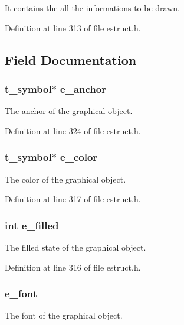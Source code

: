 It contains the all the informations to be drawn. 

Definition at line 313 of file estruct.\-h.



\subsection{Field Documentation}
\hypertarget{struct__egobj_a26003aea4ac1d50f79a5db2e05599222}{
\subsubsection[{e\-\_\-anchor}]{\setlength{\rightskip}{0pt plus 5cm}t\-\_\-symbol$\ast$ e\-\_\-anchor}}\label{struct__egobj_a26003aea4ac1d50f79a5db2e05599222}
The anchor of the graphical object. 

Definition at line 324 of file estruct.\-h.

\hypertarget{struct__egobj_a13dfb00aea95e0dc5b9d1297260a9280}{
\subsubsection[{e\-\_\-color}]{\setlength{\rightskip}{0pt plus 5cm}t\-\_\-symbol$\ast$ e\-\_\-color}}\label{struct__egobj_a13dfb00aea95e0dc5b9d1297260a9280}
The color of the graphical object. 

Definition at line 317 of file estruct.\-h.

\hypertarget{struct__egobj_ae13e50cb319a060b3e612c39d0fc698d}{
\subsubsection[{e\-\_\-filled}]{\setlength{\rightskip}{0pt plus 5cm}int e\-\_\-filled}}\label{struct__egobj_ae13e50cb319a060b3e612c39d0fc698d}
The filled state of the graphical object. 

Definition at line 316 of file estruct.\-h.

\hypertarget{struct__egobj_a4bf02b4e1a6c0c7723b5ed198f45e0b0}{
\subsubsection[{e\-\_\-font}]{ e\-\_\-font}}\label{struct__egobj_a4bf02b4e1a6c0c7723b5ed198f45e0b0}
The font of the graphical object. 

